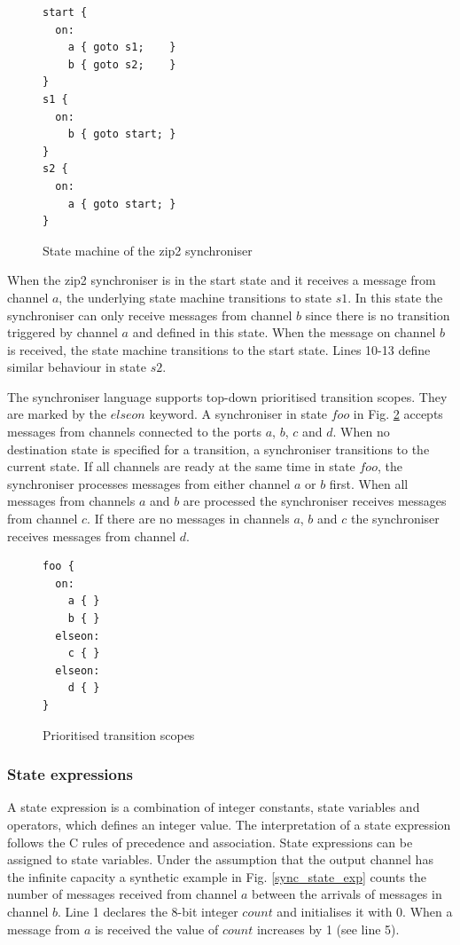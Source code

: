 \begin{figure}[h!]
\lstset{numbers=left, numberstyle=\small, stepnumber=1, numbersep=8pt}
\begin{lstlisting}[frame=single]
start {
  on:
    a { goto s1;    }
    b { goto s2;    }
}
s1 {
  on:
    b { goto start; }
}
s2 {
  on:
    a { goto start; }
}
\end{lstlisting}
\caption{State machine of the zip2 synchroniser}
\label{zip_struc}
\end{figure}

When the zip2 synchroniser is in the start state and it receives a message from channel $a$, the underlying state machine transitions to state $s1$. In this state the synchroniser can only receive messages from channel $b$ since there is no transition triggered by channel $a$ and defined in this state. When the message on channel $b$ is received, the state machine transitions to the start state. Lines 10-13 define similar behaviour in state $s2$.

The synchroniser language supports top-down prioritised transition scopes. They are marked by the $elseon$ keyword. A synchroniser in state $foo$ in Fig. \ref{sync_scope} accepts messages from channels connected to the ports $a$, $b$, $c$ and $d$. When no destination state is specified for a transition, a synchroniser transitions to the current state. If all channels are ready at the same time in state $foo$, the synchroniser processes messages from either channel $a$ or $b$ first. When all messages from channels $a$ and $b$ are processed the synchroniser receives messages from channel $c$. If there are no messages in channels $a$, $b$ and $c$ the synchroniser receives messages from channel $d$.

\begin{figure}[h!]
\lstset{numbers=left, numberstyle=\small, stepnumber=1, numbersep=8pt}
\begin{lstlisting}[frame=single]
foo {
  on:
    a { }
    b { }
  elseon:
    c { }
  elseon:
    d { }
}
\end{lstlisting}
\caption{Prioritised transition scopes}
\label{sync_scope}
\end{figure}


  \subsubsection*{State expressions}
A state expression is a combination of integer constants, state variables and operators, which defines an integer value. The interpretation of a state expression follows the C rules of precedence and association. State expressions can be assigned to state variables. Under the assumption that the output channel has the infinite capacity a synthetic example in Fig. \ref{sync_state_exp} counts the number of messages received from channel $a$ between the arrivals of messages in channel $b$. Line 1 declares the 8-bit integer $count$ and initialises it with 0. When a message from $a$ is received the value of $count$ increases by 1 (see line 5).

